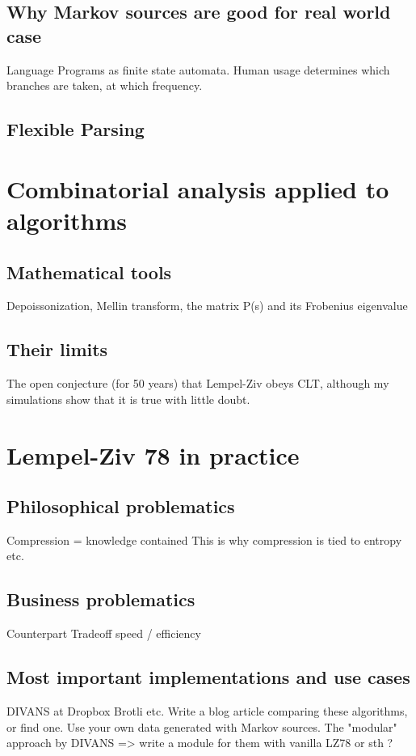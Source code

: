     \subsection{Why Markov sources are good for real world case}
        Language
        Programs as finite state automata. Human usage determines
        which branches are taken, at which frequency.
    \subsection{Flexible Parsing}

\section{Combinatorial analysis applied to algorithms}
    \subsection{Mathematical tools}
        Depoissonization, Mellin transform, the matrix P(s)
        and its Frobenius eigenvalue
    \subsection{Their limits}
        The open conjecture (for 50 years) that Lempel-Ziv
        obeys CLT, although my simulations show that it is
        true with little doubt.

\section{Lempel-Ziv 78 in practice}
    \subsection{Philosophical problematics}
        Compression = knowledge contained
        This is why compression is tied to entropy etc.
    \subsection{Business problematics}
        Counterpart
        Tradeoff speed / efficiency
    \subsection{Most important implementations and use cases}
        DIVANS at Dropbox
        Brotli
        etc.
        Write a blog article comparing these algorithms,
        or find one. Use your own data generated with 
        Markov sources.
        The "modular" approach by DIVANS => write a module 
        for them with vanilla LZ78 or sth ?
        
